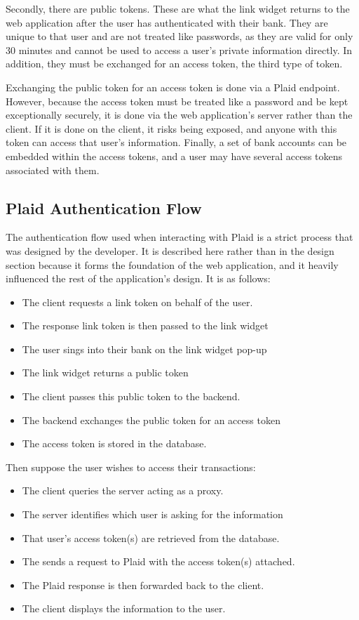 Secondly, there are public tokens. These are what the link widget returns to the web application after the user has authenticated with their bank. They are unique to that user and are not treated like passwords, as they are valid for only 30 minutes and cannot be used to access a user's private information directly. In addition, they must be exchanged for an access token, the third type of token.

Exchanging the public token for an access token is done via a Plaid endpoint. However, because the access token must be treated like a password and be kept exceptionally securely, it is done via the web application's server rather than the client. If it is done on the client, it risks being exposed, and anyone with this token can access that user's information. Finally, a set of bank accounts can be embedded within the access tokens, and a user may have several access tokens associated with them.

\subsection{Plaid Authentication Flow}
\label{sec:plaid-authentication-flow}
The authentication flow used when interacting with Plaid is a strict process that was designed by the developer. It is described here rather than in the design section because it forms the foundation of the web application, and it heavily influenced the rest of the application's design. It is as follows:

\begin{itemize}
    \item The client requests a link token on behalf of the user.
    \item The response link token is then passed to the link widget
    \item The user sings into their bank on the link widget pop-up
    \item The link widget returns a public token
    \item The client passes this public token to the backend.
    \item The backend exchanges the public token for an access token
    \item The access token is stored in the database.
\end{itemize}

Then suppose the user wishes to access their transactions:

\begin{itemize}
    \item The client queries the server acting as a proxy.
    \item The server identifies which user is asking for the information
    \item That user's access token(s) are retrieved from the database.
    \item The sends a request to Plaid with the access token(s) attached.
    \item The Plaid response is then forwarded back to the client.
    \item The client displays the information to the user.
\end{itemize}

